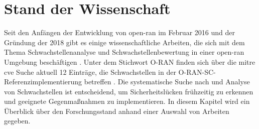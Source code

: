 \chapter{Stand der Wissenschaft}
\label{chap:forschungsstand}
Seit den Anfängen der Entwicklung von \gls{open-ran} im Februar 2016 und der Gründung der \orana{} 2018 gibt es einige wissenschaftliche Arbeiten, die sich mit dem Thema Schwachstellenanalyse und Schwachstellenbewertung in einer \gls{open-ran} Umgebung beschäftigen \autocite{ORANAlliance,GuideOpenRAN}. Unter dem Stichwort \glqq{}O-RAN\grqq{} finden sich über die \gls{mitre} \gls{cve} Suche aktuell 12 Einträge, die Schwachstellen in der O-RAN-SC-Referenzimplementierung betreffen \autocite{CVESearchResults}. Die systematische Suche nach und Analyse von Schwachstellen ist entscheidend, um Sicherheitslücken frühzeitig zu erkennen und geeignete Gegenmaßnahmen zu implementieren. In diesem Kapitel wird ein Überblick über den Forschungsstand anhand einer Auswahl von Arbeiten gegeben.

%
